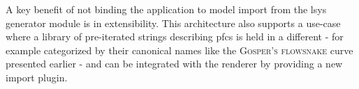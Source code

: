 A key benefit of not binding the application to model import from the \gls{lsys} generator module is in extensibility. This architecture also supports a use-case where a library of pre-iterated strings describing \gls{pfc}s is held in a different  - for example categorized by their canonical names like the \textsc{Gosper's flowsnake} curve presented earlier - and can be integrated with the renderer by providing a new import plugin.
